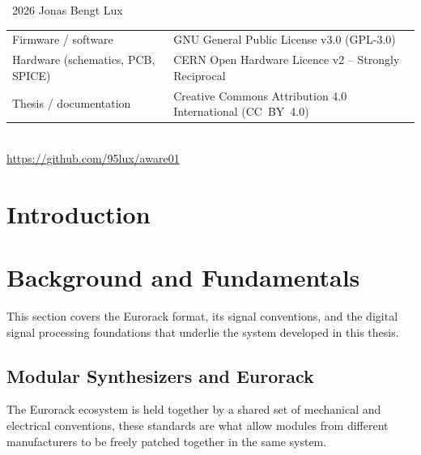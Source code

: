\documentclass{article}
\begin{document}
\newpage
\thispagestyle{empty}
\vspace*{\fill}
\begin{center}
  \textcopyright~2026 Jonas Bengt Lux\\[0.8em]
  \small
  \begin{tabular}{ll}
    Firmware / software                & GNU General Public License v3.0 (GPL-3.0) \\[0.3em]
    Hardware (schematics, PCB, SPICE)  & CERN Open Hardware Licence v2 -- Strongly Reciprocal \\[0.3em]
    Thesis / documentation             & Creative Commons Attribution 4.0 International (CC~BY~4.0) \\
  \end{tabular}\\[1em]
  \url{https://github.com/95lux/aware01}
\end{center}
\vspace*{\fill}

\pagestyle{empty}

\newpage
{}
\tableofcontents

\newpage
{\setlength{\cftbeforefigskip}{2pt}
	\listoffigures}



\newpage
\pagestyle{plain}
\setcounter{page}{1}
\section{Introduction}



\newpage
\section{Background and Fundamentals}
	This section covers the Eurorack format, its signal conventions, and the digital signal processing foundations that underlie the system developed in this thesis.
	\subsection{Modular Synthesizers and Eurorack}
	The Eurorack ecosystem is held together by a shared set of mechanical and electrical conventions, these standards are what allow modules from different manufacturers to be freely patched together in the same system.
    \label{sec:eurorack-fundamentals}
	
	
	
%	
    \newpage
	
\end{document}
